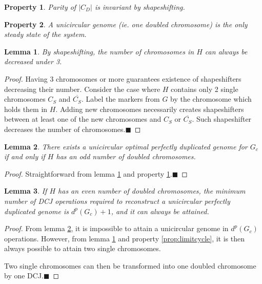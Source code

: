 \documentclass[11pt,final,twoside,nofrench]{thlifl}
\newcommand{\qed}{\ensuremath{\blacksquare}}
\newcommand{\snd}[1]{ \ensuremath{\overline{#1}} }
\newtheorem{property}{Property}
\newtheorem{proof}{Proof}
\newtheorem{lemma}{Lemma}
\begin{document}
\begin{property}
\label{prop:invariant}
  Parity of $|C_D|$ is invariant by shapeshifting.
\end{property}

\begin{property}
\label{prop:steadystate}
 A unicircular genome (ie. one doubled chromosome) is the only steady state of the system.
\end{property}

\begin{lemma}
\label{lem:under3}
  By shapeshifting, the number of chromosomes in $H$ can always be decreased under 3.
\end{lemma}

\begin{proof}
Having 3 chromosomes or more guarantees existence of shapeshifters decreasing their number.
Consider the case where $H$ contains only 2 single chromosomes $C_S$ and $\snd{C_S}$. Label the markers from $G$ by the chromosome which holds them in $H$. Adding new chromosomes necessarily creates shapeshifters between at least one of the new chromosomes and $C_S$ or $\snd{C_S}$. Such shapeshifter decreases the number of chromosomes.\qed
\end{proof}

\begin{lemma}
\label{lem:oddCd}
There exists a unicircular optimal perfectly duplicated genome for $G_c$ if and only if $H$ has an \emph{odd} number of doubled chromosomes.
\end{lemma}
\begin{proof}
Straightforward from lemma \ref{lem:under3} and property \ref{prop:invariant}.\qed
\end{proof}

\begin{lemma}
\label{lem:evenCd}
If $H$ has an \emph{even} number of doubled chromosomes, the minimum number of DCJ operations required to reconstruct a unicircular perfectly duplicated genome is $d^p(G_c)+1$, and it can always be attained.
\end{lemma}
\begin{proof}
From lemma \ref{lem:oddCd}, it is impossible to attain a unicircular genome in $d^p(G_c)$ operations. However, from lemma \ref{lem:under3} and property \ref{prop:limitcycle}, it is then always possible to attain two single chromosomes.

Two single chromosomes can then be transformed into one doubled chromosome by one DCJ.\qed
\end{proof}
\end{document}
